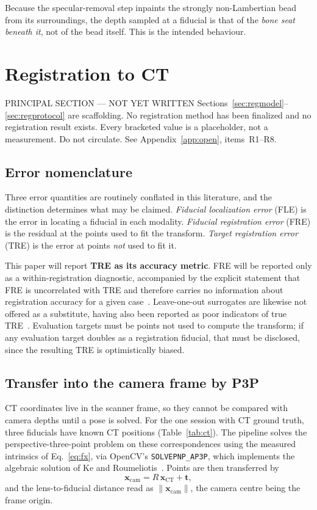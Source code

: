 \documentclass[journal,10pt]{IEEEtran}
\newcommand{\vecx}{\bm{x}}
\begin{document}
Because the specular-removal step inpaints the strongly non-Lambertian bead from
its surroundings, the depth sampled at a fiducial is that of the \emph{bone seat
beneath it}, not of the bead itself. This is the intended behaviour.

\section{Registration to CT}\label{sec:reg}

\begin{todobox}{PRINCIPAL SECTION --- NOT YET WRITTEN}
Sections~\ref{sec:regmodel}--\ref{sec:regprotocol} are scaffolding. No
registration method has been finalized and no registration result exists. Every
bracketed value is a placeholder, not a measurement. Do not circulate. See
Appendix~\ref{app:open}, items~R1--R8.
\end{todobox}

\subsection{Error nomenclature}\label{sec:regerr}
Three error quantities are routinely conflated in this literature, and the
distinction determines what may be claimed. \emph{Fiducial localization error}
(FLE) is the error in locating a fiducial in each modality. \emph{Fiducial
registration error} (FRE) is the residual at the points used to fit the
transform. \emph{Target registration error} (TRE) is the error at points
\emph{not} used to fit it.

This paper will report \textbf{TRE as its accuracy metric}. FRE will be reported
only as a within-registration diagnostic, accompanied by the explicit statement
that FRE is uncorrelated with TRE and therefore carries no information about
registration accuracy for a given case~\cite{fitzpatrick1998,fitzpatrick2009}.
Leave-one-out surrogates are likewise not offered as a substitute, having also
been reported as poor indicators of true TRE~\cite{shamir2009}. Evaluation
targets must be points not used to compute the transform; if any evaluation
target doubles as a registration fiducial, that must be disclosed, since the
resulting TRE is optimistically biased.

\subsection{Transfer into the camera frame by P3P}\label{sec:p3p}
CT coordinates live in the scanner frame, so they cannot be compared with camera
depths until a pose is solved. For the one session with CT ground truth, three
fiducials have known CT positions (Table~\ref{tab:ct}). The pipeline solves the
perspective-three-point problem on these correspondences using the measured
intrinsics of Eq.~\eqref{eq:fx}, via OpenCV's \texttt{SOLVEPNP\_AP3P}, which
implements the algebraic solution of Ke and Roumeliotis~\cite{ke2017}. Points are
then transferred by
\begin{equation}
\vecx_\mathrm{cam} = R\,\vecx_\mathrm{CT} + \bm{t},
\end{equation}
and the lens-to-fiducial distance read as $\lVert\vecx_\mathrm{cam}\rVert$, the
camera centre being the frame origin.
\end{document}

